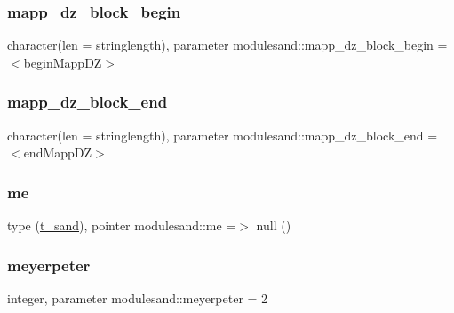 \subsubsection{\texorpdfstring{mapp\+\_\+dz\+\_\+block\+\_\+begin}{mapp\_dz\_block\_begin}}
{\footnotesize\ttfamily character(len = stringlength), parameter modulesand\+::mapp\+\_\+dz\+\_\+block\+\_\+begin = \textquotesingle{}$<$begin\+Mapp\+DZ$>$\textquotesingle{}\hspace{0.3cm}{\ttfamily [private]}}

\mbox{\label{namespacemodulesand_aa6b7846e5c1d3f70a1f74b7ff2251da6}} 
\subsubsection{\texorpdfstring{mapp\+\_\+dz\+\_\+block\+\_\+end}{mapp\_dz\_block\_end}}
{\footnotesize\ttfamily character(len = stringlength), parameter modulesand\+::mapp\+\_\+dz\+\_\+block\+\_\+end = \textquotesingle{}$<$end\+Mapp\+DZ$>$\textquotesingle{}\hspace{0.3cm}{\ttfamily [private]}}

\mbox{\label{namespacemodulesand_a8a3859b7501b07ac6835ae78e6a9d150}} 
\subsubsection{\texorpdfstring{me}{me}}
{\footnotesize\ttfamily type (\mbox{\hyperlink{structmodulesand_1_1t__sand}{t\+\_\+sand}}), pointer modulesand\+::me =$>$ null ()\hspace{0.3cm}{\ttfamily [private]}}

\mbox{\label{namespacemodulesand_a053c30ed1ae972fb1e01367675decc64}} 
\subsubsection{\texorpdfstring{meyerpeter}{meyerpeter}}
{\footnotesize\ttfamily integer, parameter modulesand\+::meyerpeter = 2\hspace{0.3cm}{\ttfamily [private]}}

